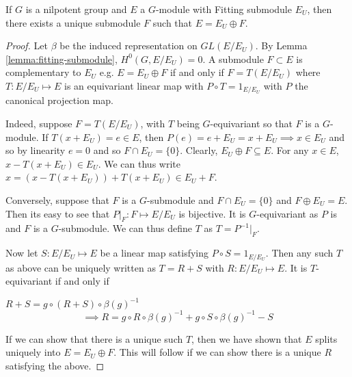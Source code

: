 \begin{lemma}
    If $G$ is a nilpotent group and $E$ a $G$-module with Fitting submodule $E_U$, then there exists a
    unique submodule $F$ such that $E = E_U \oplus F$.
\end{lemma}
\begin{proof}
    Let $\beta$ be the induced representation on $GL(E/E_U)$. By Lemma \ref{lemma:fitting-submodule}, $H^0(G, E/E_U) = 0$.
    A submodule $F \subset E$ is complementary to $E_U$ e.g. $E = E_U \oplus F$ if and only if
    $F=T(E/E_U)$ where $T:E/E_U \mapsto E$ is an equivariant linear map with $P \circ T = 1_{E/E_U}$ with $P$ the
    canonical projection map.

    Indeed, suppose $F=T(E/E_U)$, with $T$ being $G$-equivariant so that $F$ is a
    $G$-module. If $T(x+E_U) = e \in E$, then $P(e) = e+E_U = x+E_U \implies x \in
        E_U$ and so by linearity $e = 0$ and so $F \cap E_U = \{0\}$. Clearly, $E_U
        \oplus F \subseteq E$. For any $x \in E$, $x-T(x+E_U) \in E_U$. We can thus
    write $x = (x-T(x+E_U)) + T(x+E_U) \in E_U + F$.

    Conversely, suppose that $F$ is a $G$-submodule and $F \cap E_U = \{0\}$ and $F
        \oplus E_U = E$. Then its easy to see that $P|_F : F \mapsto E/E_U$ is
    bijective. It is $G$-equivariant as $P$ is and $F$ is a $G$-submodule. We can
    thus define $T$ as $T = P^{-1}|_F$.

    Now let $S: E/E_U \mapsto E$ be a linear map satisfying $P \circ S =
        1_{E/E_U}$. Then any such $T$ as above can be uniquely written as $T = R + S$
    with $R: E/E_U \mapsto E$. It is $T$-equivariant if and only if

    \begin{center}
        $R + S = g \circ (R + S)\circ \beta(g)^{-1}$\\
        \begin{equation}\label{eq:fixed-point}
            \implies R = g\circ R \circ \beta(g)^{-1} + g\circ S \circ \beta(g)^{-1} - S
        \end{equation}
    \end{center}
    If we can show that there is a unique such $T$, then we have shown that $E$ splits uniquely into $E = E_U \oplus F$.
    This will follow if we can show there is a unique $R$ satisfying the above.


\end{proof}
